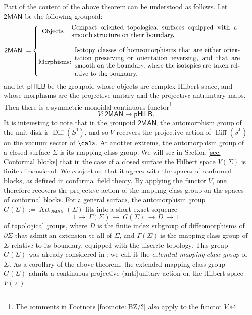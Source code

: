 \documentclass[a4paper,10pt,leqno]{amsart}
\theoremstyle{plain}
\theoremstyle{definition}
\theoremstyle{remark}
\DeclareMathOperator{\aut}{Aut}
\DeclareMathOperator{\Diff}{Diff}
\begin{document}
Part of the content of the above theorem can be understood as follows.
Let $\mathsf{2MAN}$ be the following groupoid:
\begin{equation}\label{eq: def of 2MAN}
\mathsf{2MAN}:=\begin{cases}
\,\,\,\text{Objects:}\,\,\,\,\,\,\parbox{9cm}{Compact oriented topological surfaces equipped with a smooth structure on their boundary.}
\\\\
\text{Morphisms:}\,\,\,\parbox{9cm}{Isotopy classes of homeomorphisms that are either orientation preserving or orientation reversing, and that are smooth on the boundary, where the isotopies are taken relative to the boundary.}
\end{cases}
\end{equation}
and let $\mathsf{pHILB}$ be the groupoid whose objects are complex Hilbert space, and whose morphisms are the projective unitary and the projective antiunitary maps.
Then there is a symmetric monoidal continuous functor\footnote{The comments in Footnote \ref{footnote: BZ/2} also apply to the functor $V$.}
\begin{equation}\label{eq: 2MAN --> pHILB}
V:\mathsf{2MAN}\to \mathsf{pHILB}.
\end{equation}
It is interesting to note that in the groupoid $\mathsf{2MAN}$, the automorphism group of the unit disk is $\Diff(S^1)$, and so $V$ recovers 
the projective action of $\Diff(S^1)$ on the vacuum sector of $\cala$.
At another extreme, the automorphism group of a closed surface $\Sigma$ is its mapping class group.
We will see in Section \ref{sec: Conformal blocks} that in the case of a closed surface the Hilbert space $V(\Sigma)$ is finite dimensional.
We conjecture that it agrees with the spaces of conformal blocks, as defined in conformal field theory.
By applying the functor $V$, one therefore recovers the projective action of the mapping class group on the spaces of conformal blocks.
For a general surface, the automorphism group $G(\Sigma):=\aut_\mathsf{2MAN}(\Sigma)$ fits into a short exact sequence
\begin{equation}\label{def: G(Sigma)}
1\,\to\, \Gamma(\Sigma)\,\to\, G(\Sigma)\,\to\, D\,\to\, 1
\end{equation}
of topological groups, where $D$ is the finite index subgroup of diffeomorphisms of $\partial \Sigma$ that admit an extension to all of $\Sigma$, and $\Gamma(\Sigma)$ is the mapping class group of $\Sigma$ relative to its boundary, equipped with the discrete topology.
This group $G(\Sigma)$ was already considered in \cite[Thm.~2.11]{Posthuma(The-Heisenberg-group-and-conformal-field-theory)};
we call it the \emph{extended mapping class group} of $\Sigma$.
As a corollary of the above theorem,
the extended mapping class group $G(\Sigma)$ admits a continuous projective (anti)unitary action on the Hilbert space $V(\Sigma)$.
\end{document}

